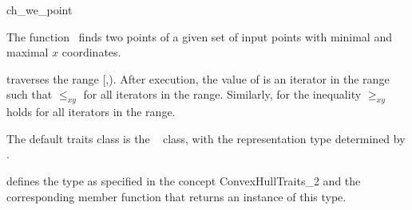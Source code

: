 

\begin{ccRefFunction}{ch_we_point}  %

\ccDefinition
  
The function \ccRefName\ finds two points of a given set  
of input points with minimal and maximal $x$ coordinates.


           {traverses the range [,).
            After execution, the value of
             is an iterator in the range such that  $\le_{xy}$
             for all iterators  in the range. Similarly, for
             the inequality  $\ge_{xy}$ 
            holds for all iterators in the range.}


The default traits class  is the \cgal\ 
 class,
with the representation type determined by .

 defines the type  as specified in
the concept ConvexHullTraits\_2 and the corresponding member
function that returns an instance of this type.


\ccSeeAlso

 \\
 \\
 \\
 \\
 \\
 \\

\end{ccRefFunction}



